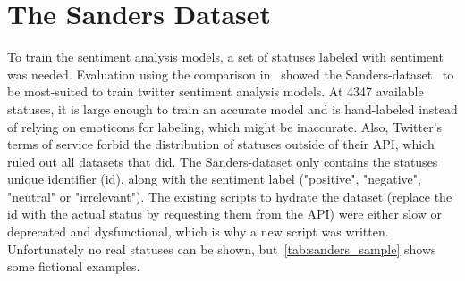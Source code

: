 \section{The Sanders Dataset}
\label{sec:theSandersDataset}

To train the sentiment analysis models, a set of statuses labeled with sentiment was needed.
Evaluation using the comparison in~\cite{Saif2013} showed the Sanders-dataset~\cite{sanders} to be most-suited to train twitter sentiment analysis models.
At 4347 available statuses, it is large enough to train an accurate model and is hand-labeled instead of relying on emoticons for labeling, which might be inaccurate.
Also, Twitter's terms of service forbid the distribution of statuses outside of their API, which ruled out all datasets that did.
The Sanders-dataset only contains the statuses unique identifier (id), along with the sentiment label ("positive", "negative", "neutral" or "irrelevant").
The existing scripts to hydrate the dataset (replace the id with the actual status by requesting them from the API) were either slow or deprecated and dysfunctional,
which is why a new script was written.
Unfortunately no real statuses can be shown, but~\ref{tab:sanders_sample} shows some fictional examples.

\begin{table}
    \caption{Some fictional statuses with labels}
    \label{tab:sanders_sample}
\end{table}

